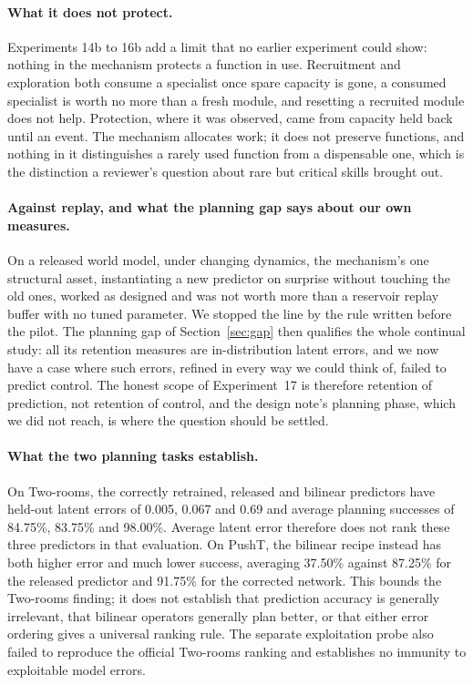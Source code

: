 \documentclass[11pt,a4paper]{article}
\begin{document}
\paragraph{What it does not protect.} Experiments 14b to 16b add a limit that no earlier experiment could show: nothing in the mechanism protects a function in use. Recruitment and exploration both consume a specialist once spare capacity is gone, a consumed specialist is worth no more than a fresh module, and resetting a recruited module does not help. Protection, where it was observed, came from capacity held back until an event. The mechanism allocates work; it does not preserve functions, and nothing in it distinguishes a rarely used function from a dispensable one, which is the distinction a reviewer's question about rare but critical skills brought out.

\paragraph{Against replay, and what the planning gap says about our own measures.} On a released world model, under changing dynamics, the mechanism's one structural asset, instantiating a new predictor on surprise without touching the old ones, worked as designed and was not worth more than a reservoir replay buffer with no tuned parameter. We stopped the line by the rule written before the pilot. The planning gap of Section~\ref{sec:gap} then qualifies the whole continual study: all its retention measures are in-distribution latent errors, and we now have a case where such errors, refined in every way we could think of, failed to predict control. The honest scope of Experiment~17 is therefore retention of prediction, not retention of control, and the design note's planning phase, which we did not reach, is where the question should be settled.

\paragraph{What the two planning tasks establish.} On Two-rooms, the correctly retrained, released and bilinear predictors have held-out latent errors of 0.005, 0.067 and 0.69 and average planning successes of 84.75\%, 83.75\% and 98.00\%. Average latent error therefore does not rank these three predictors in that evaluation. On PushT, the bilinear recipe instead has both higher error and much lower success, averaging 37.50\% against 87.25\% for the released predictor and 91.75\% for the corrected network. This bounds the Two-rooms finding; it does not establish that prediction accuracy is generally irrelevant, that bilinear operators generally plan better, or that either error ordering gives a universal ranking rule. The separate exploitation probe also failed to reproduce the official Two-rooms ranking and establishes no immunity to exploitable model errors.
\end{document}
